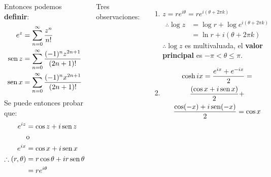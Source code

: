 \documentclass[9pt, aspectratio=169]{beamer}
\begin{document}
\begin{frame}
\begin{columns}[t]
    Entonces podemos \textbf{definir}:
    \begin{align*}
      e^z &= \sum_{n = 0}^{\infty} \frac{z^n}{n!} \\
      \operatorname{sen} z &= \sum_{n = 0}^{\infty} \frac{(-1)^n z^{2 n + 1}}{(2n +1)!} \\
     \operatorname{sen} x &= \sum_{n = 0}^{\infty} \frac{(-1)^n x^{2 n + 1}}{(2n +1)!} \\
    \end{align*}
    Se puede entonces probar que:
    \begin{align*}
        e^{iz} &= \cos z + i \operatorname{sen} z \\
               &\text{o} \\
        e^{ix} &= \cos x + i \operatorname{sen} x \\
        \therefore (r, \theta) &= r \cos \theta + i r \operatorname{sen} \theta \\
                               &= r e^{i \theta}
    \end{align*}

    Tres observaciones:
    \begin{enumerate}
    \item $z = r e^{i \theta} = r e^{i(\theta + 2 \pi k)} $
        \begin{align*}
        \therefore \log z &= \log r + \log e^{i(\theta + 2 \pi k)} \\
                          &= \ln r + i (\theta + 2 \pi k)
        \end{align*}
        $\therefore \log z$ es multivaluada, el \textbf{valor principal} es $-\pi < \theta \leq \pi$.
    \item 
        \begin{multline*}
            \cosh i x = \frac{e^{ix} + e^{-ix}}{2} = \\
        \frac{(\cos x + i \operatorname{sen} x)}{2} + \\
    \frac{\cos(-x) + i \operatorname{sen}(-x)}{2} = \cos x
        \end{multline*}   
\end{enumerate}


\end{columns}
\end{frame}
\end{document}

